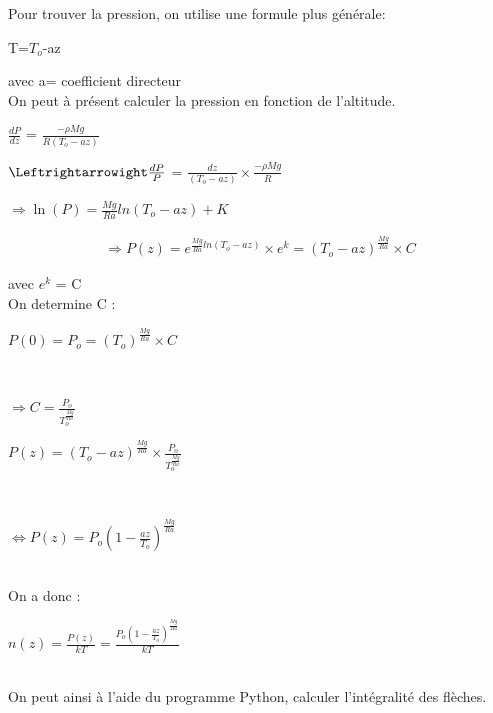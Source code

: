 \documentclass[a4paper, 12pt]{report} %
\begin{document}
Pour trouver la pression, on utilise une formule plus générale:\\
\begin{center}
T=$T_o$-az      
\end{center}
avec a= coefficient directeur \\

On peut à présent calculer la pression en fonction de l'altitude. 
\begin{center}
     $\frac{dP}{dz}$ = $\frac{-\rho Mg}{R(T_o-az)}$ \\
\end{center}

\begin{center}
     $\Leftrightarrowight\frac{dP}{P}$ = $\frac{dz }{(T_o-az)} \times \frac{-\rho Mg}{R}$\\
\end{center}

\begin{center}
     $\Rightarrow \ln(P)=\frac{Mg}{Ra} ln(T_o-az)+K$\\
\end{center}

\begin{align*}
     \Rightarrow P(z) = e^{\frac{Mg}{Ra}ln(T_o-az)} \times e^k =(T_o -az)^{\frac{Mg}{Ra}} \times C
\end{align*}

avec $e^{k}$ = C\\

 On determine C :
\begin{center}
$P(0)= P_o = (T_o)^{\frac{Mg}{Ra}} \times C$\\
\end{center}\\

\begin{center}
$\Rightarrow C= \frac{P_o}{T_o^{\frac{Mg}{Ra}}}$
\end{center}

\begin{center}
$P(z) = (T_o -az)^{\frac{Mg}{Ra}} \times \frac{P_o}{T_o^{\frac{Mg}{Ra}}}$
\end{center}\\

\begin{center}
$\Leftrightarrow P(z)= P_o (1-\frac{az}{T_o})^{\frac{Mg}{Ra}}$
\end{center}\\

On a donc :
\begin{center}
   $n(z)=\frac{P(z)}{kT}= \frac{ P_o (1-\frac{az}{T_o})^{\frac{Mg}{Ra}}}{kT}$
\end{center}\\
On peut ainsi à l'aide du programme Python, calculer l'intégralité des flèches.
\end{document}
